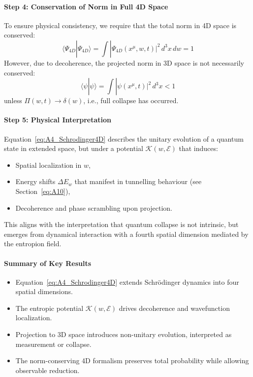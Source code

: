 \documentclass[12pt]{article}
\begin{document}
\paragraph{Step 4: Conservation of Norm in Full 4D Space}

To ensure physical consistency, we require that the total norm in 4D space is conserved:
\begin{equation}
\langle \Psi_{4D} | \Psi_{4D} \rangle = \int |\Psi_{4D}(x^\mu, w, t)|^2\, d^3x\, dw = 1
\label{eq:A4_4DNorm}
\end{equation}
However, due to decoherence, the projected norm in 3D space is not necessarily conserved:
\begin{equation}
\langle \psi | \psi \rangle = \int |\psi(x^\mu, t)|^2\, d^3x < 1
\end{equation}
unless \(\Pi(w, t) \to \delta(w)\), i.e., full collapse has occurred.

\paragraph{Step 5: Physical Interpretation}

Equation~\eqref{eq:A4_Schrodinger4D} describes the unitary evolution of a quantum state in extended space, but under a potential \(\mathcal{K}(w, \mathcal{E})\) that induces:
\begin{itemize}
  \item Spatial localization in \(w\),
  \item Energy shifts \(\Delta E_w\) that manifest in tunnelling behaviour (see Section~\ref{eq:A10}),
  \item Decoherence and phase scrambling upon projection.
\end{itemize}

This aligns with the interpretation that quantum collapse is not intrinsic, but emerges from dynamical interaction with a fourth spatial dimension mediated by the entropion field.

\paragraph{Summary of Key Results}

\begin{itemize}
  \item Equation~\eqref{eq:A4_Schrodinger4D} extends Schrödinger dynamics into four spatial dimensions.
  \item The entropic potential \(\mathcal{K}(w, \mathcal{E})\) drives decoherence and wavefunction localization.
  \item Projection to 3D space introduces non-unitary evolution, interpreted as measurement or collapse.
  \item The norm-conserving 4D formalism preserves total probability while allowing observable reduction.
\end{itemize}
\end{document}
